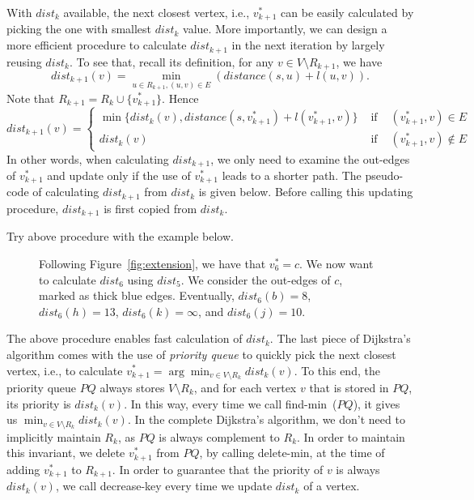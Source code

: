 With $dist_k$ available, the next closest vertex, i.e., $v_{k+1}^*$ can be easily calculated
by picking the one with smallest $dist_k$ value.
More importantly, we can design a more efficient procedure
to calculate $dist_{k+1}$ in the next iteration by largely reusing $dist_k$.
To see that, recall its definition, for any $v\in V\setminus R_{k+1}$, we have 
$$dist_{k+1}(v) = \textstyle \min_{u\in R_{k+1}, (u, v)\in E} (distance(s, u) + l(u,v)).$$
Note that $R_{k+1} = R_k \cup \{v_{k+1}^*\}$. Hence
\begin{displaymath}
dist_{k+1}(v) = \left\{
\begin{array}{llllll}
\min\{ dist_k(v), distance(s, v_{k+1}^*) + l(v_{k+1}^*, v) \} & \textrm{ if } & (v_{k+1}^*, v) \in E \\
dist_k(v) & \textrm{ if } & (v_{k+1}^*, v) \not\in E
\end{array}
\right.
\end{displaymath}
In other words, when calculating $dist_{k+1}$, we only need to examine the out-edges of $v_{k+1}^*$
and update only if the use of $v_{k+1}^*$ leads to a shorter path. The pseudo-code of
calculating $dist_{k+1}$ from $dist_k$ is given below.
Before calling this updating procedure, $dist_{k+1}$ is first copied from $dist_k$.

\begin{minipage}{0.8\textwidth}
	\xxx
	\xxx
	\xxx
	\xxx
	\xxx
	\xxx
	\xxx
\end{minipage}

Try above procedure with the example below.

\begin{figure}[h!]
\centering{}
\caption{Following Figure~\ref{fig:extension}, we have that $v_6^* = c$.
We now want to calculate $dist_6$ using $dist_5$. We consider the out-edges of $c$, marked as thick blue edges.
Eventually, $dist_6(b) = 8$, $dist_6(h) = 13$, $dist_6(k) = \infty$, and $dist_6(j) = 10$.  }
\label{fig:update}
\end{figure}

The above procedure enables fast calculation of $dist_k$.
The last piece of Dijkstra's algorithm comes with the use of \emph{priority queue}
to quickly pick the next closest vertex, i.e., to calculate $v_{k+1}^* = \arg\min_{v\in V\setminus R_k} dist_k(v)$.
To this end, the priority queue $PQ$ always stores $V\setminus R_k$,
and for each vertex $v$ that is stored in $PQ$, its priority is $dist_k(v)$.
In this way, every time we call find-min~($PQ$), it gives us $\min_{v\in V\setminus R_k} dist_k(v)$.
In the complete Dijkstra's algorithm, we don't need to implicitly maintain $R_k$,
as $PQ$ is always complement to $R_k$.
In order to maintain this invariant, we delete $v_{k+1}^*$ from $PQ$, by calling delete-min, at the time of adding $v_{k+1}^*$ to $R_{k+1}$.
In order to guarantee that the priority of $v$ is always $dist_k(v)$,
we call decrease-key every time we update $dist_k$ of a vertex.

